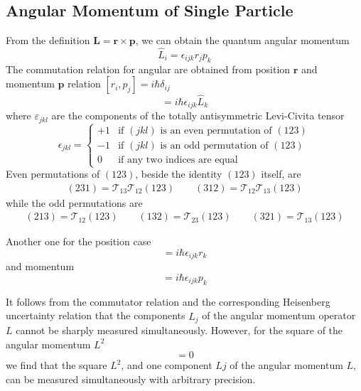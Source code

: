 \documentclass[../../../main.tex]{subfiles}
\begin{document}
\subsection{Angular Momentum of Single Particle}
From the definition $\mathbf{L}= \mathbf{r} \times \mathbf{p}$, we can obtain the quantum angular momentum
\begin{equation*}
    \hat{L}_i = \epsilon_{ijk}r_jp_k
\end{equation*}
The commutation relation for angular are obtained from position $\mathbf{r}$ and momentum $\mathbf{p}$ relation $[r_i   , p_j]=i \hbar \delta_{ij}$
\begin{equation*}
    [\hat{L}_{i}, \hat{L}_{j}] = i \hbar \epsilon_{ijk} \hat{L}_{k}
\end{equation*}
where $\varepsilon_{jkl}$ are the components of the totally antisymmetric Levi-Civita tensor
\begin{equation*}
    \epsilon_{jkl} = \begin{cases}
        +1 & \text{if } (jkl) \text{ is an even permutation of } (123) \\
        -1 & \text{if } (jkl) \text{ is an odd permutation of } (123)  \\
        0  & \text{if any two indices are equal}
    \end{cases}
\end{equation*}
Even permutations of $(123)$, beside the identity $(123)$ itself, are
\begin{align*}
    (231)  =  \mathcal{T}_{13} \mathcal{T}_{12}(123) \qquad
    (312)  =  \mathcal{T}_{12} \mathcal{T}_{13}(123)
\end{align*}
while the odd permutations are
\begin{align*}
    (213)  =  \mathcal{T}_{12}(123) \qquad
    (132)  =  \mathcal{T}_{23}(123) \qquad
    (321)  =  \mathcal{T}_{13}(123)
\end{align*}

Another one for the position case
\begin{equation*}
    [r_{i}, \hat{L}_{j}] = i \hbar \epsilon_{ijk} r_{k}
\end{equation*}
and momentum
\begin{equation*}
    [p_{i}, \hat{L}_{j}] = i \hbar \epsilon_{ijk} p_{k}
\end{equation*}

It follows from the commutator relation and the corresponding Heisenberg uncertainty relation that the components $\hat{L}_j$ of the angular momentum operator $L$ cannot be sharply measured simultaneously.
However, for the square of the angular momentum $L^2$
\begin{equation*}
    [L^2,\hat{L}_j] = 0
\end{equation*}
we find that the square $L^2$, and one component $Lj$ of the angular momentum $L$, can be measured simultaneously with arbitrary precision.
\end{document}
